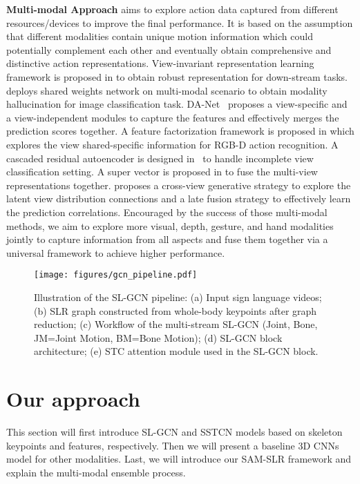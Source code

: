 \documentclass[final]{cvpr}
\begin{document}
\label{sec:related_work}
\noindent\textbf{Multi-modal Approach} aims to explore action data captured from different resources/devices to improve the final performance. It is based on the assumption that different modalities contain unique motion information which could potentially complement each other and eventually obtain comprehensive and distinctive action representations. 
View-invariant representation learning framework is proposed in \cite{zheng2016cross,wang2013dense} to obtain robust representation for down-stream tasks. \cite{hoff_CVPR16} deploys shared weights network on multi-modal scenario to obtain modality hallucination for image classification task. DA-Net~\cite{Wang_2018_ECCV} proposes a view-specific and a view-independent modules to capture the features and effectively merges the prediction scores together. 
A feature factorization framework is proposed in \cite{shahroudy2018deep} which explores the view shared-specific information for RGB-D action recognition. A cascaded residual autoencoder is designed in~\cite{tran_CVPR17} to handle incomplete view classification setting. A super vector is proposed in \cite{multiview_action2} to fuse the multi-view representations together. \cite{GMVAR_Lichen} proposes a cross-view generative strategy to explore the latent view distribution connections and a late fusion strategy to effectively learn the prediction correlations. 
Encouraged by the success of those multi-modal methods, we aim to explore more visual, depth, gesture, and hand modalities jointly to capture information from all aspects and fuse them together via a universal framework to achieve higher performance.

\begin{figure*}[!ht]
  \centering
  \texttt{[image: figures/gcn\_pipeline.pdf]}
  \caption{Illustration of the SL-GCN pipeline: (a) Input sign language videos; (b) SLR graph constructed from whole-body keypoints after graph reduction; (c) Workflow of the multi-stream SL-GCN (Joint, Bone, JM=Joint Motion, BM=Bone Motion); (d) SL-GCN block architecture; (e) STC attention module used in the SL-GCN block. }
\label{fig:gcn-pipeline}\end{figure*}










\section{Our approach}
This section will first introduce SL-GCN and SSTCN models based on skeleton keypoints and features, respectively. Then we will present a baseline 3D CNNs model for other modalities. Last, we will introduce our SAM-SLR framework and explain the multi-modal ensemble process.
\end{document}
